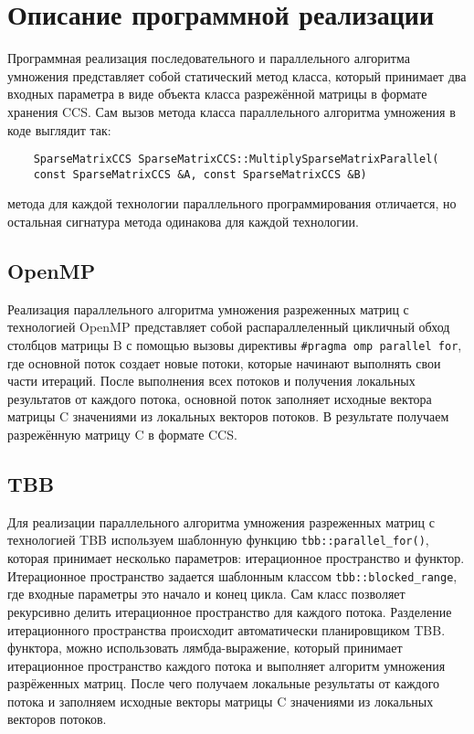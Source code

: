 \documentclass{report}
\begin{document}
	
	\section*{Описание программной реализации}
	Программная реализация последовательного и параллельного алгоритма умножения представляет собой статический метод класса, который принимает два входных параметра в виде объекта класса разрежённой матрицы в формате хранения CCS. Сам вызов метода класса параллельного алгоритма умножения в коде выглядит так:
	\begin{lstlisting}
	SparseMatrixCCS SparseMatrixCCS::MultiplySparseMatrixParallel(
	const SparseMatrixCCS &A, const SparseMatrixCCS &B)
	\end{lstlisting}
	 метода для каждой технологии параллельного программирования отличается, но остальная сигнатура метода одинакова для каждой технологии.
	
	\subsection*{OpenMP}
	Реализация параллельного алгоритма умножения разреженных матриц с технологией OpenMP представляет собой распараллеленный цикличный обход столбцов матрицы B с помощью вызовы директивы \verb|#pragma omp parallel for|, где основной поток создает новые потоки, которые начинают выполнять свои части итераций. После выполнения всех потоков и получения локальных результатов от каждого потока, основной поток заполняет исходные вектора матрицы C значениями из локальных векторов потоков. В результате получаем разрежённую матрицу C в формате CCS.
	
	
	\subsection*{TBB}
	Для реализации параллельного алгоритма умножения разреженных матриц с технологией TBB используем шаблонную функцию \verb|tbb::parallel_for()|, которая принимает несколько параметров: итерационное пространство и функтор. Итерационное пространство задается шаблонным классом \verb|tbb::blocked_range|, где входные параметры это начало и конец цикла. Сам класс позволяет рекурсивно делить итерационное пространство для каждого потока. Разделение итерационного пространства происходит автоматически планировщиком TBB.
	 функтора, можно использовать лямбда-выражение, который принимает итерационное пространство каждого потока и выполняет алгоритм умножения разрёженных матриц. После чего получаем локальные результаты от каждого потока и заполняем исходные векторы матрицы C значениями из локальных векторов потоков. 
	
\end{document}
